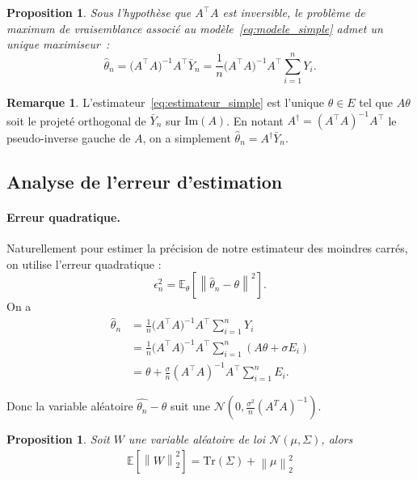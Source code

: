 \documentclass[12pt, a4paper]{article}
\newtheorem{proposition}[theorem]{Proposition}
\theoremstyle{definition}
\newtheorem{remark}[theorem]{Remarque}
\newcommand{\E}{\mathbb{E}}
\newcommand{\norm}[1]{\left\|#1\right\|}
\newcommand{\Tr}{\mathrm{Tr}}
\begin{document}
\begin{proposition}
Sous l'hypothèse que $A^\top A$ est inversible, le problème de maximum de
vraisemblance associé au modèle~\eqref{eq:modele_simple} admet un unique
maximiseur~:
\begin{equation}
    \hat{\theta}_n
    = \bigl(A^\top A\bigr)^{-1}A^\top \bar{Y}_n
    = \frac{1}{n}\bigl(A^\top A\bigr)^{-1}A^\top\sum_{i=1}^{n} Y_i.
    \label{eq:estimateur_simple}
\end{equation}
\end{proposition}

\begin{remark}
L'estimateur~\eqref{eq:estimateur_simple} est l'unique $\theta \in E$ tel que
$A\theta$ soit le projeté orthogonal de $\bar{Y}_n$ sur $\mathrm{Im}(A)$.
En notant $A^\dagger = (A^\top A)^{-1}A^\top$ le pseudo-inverse gauche de $A$,
on a simplement $\hat{\theta}_n = A^\dagger\bar{Y}_n$.
\end{remark}

\subsection{Analyse de l'erreur d'estimation}
\label{subsec:erreur_simple}


\paragraph{Erreur quadratique.}
Naturellement pour estimer la précision de notre estimateur des moindres
carrés, on utilise l'erreur quadratique :
\[
    \epsilon_n^2 = \E_{\theta}\!\left[\norm{\hat{\theta}_n - \theta}^2\right].
\]
On a
\begin{align*}
    \hat{\theta}_n
    &= \frac{1}{n}\bigl(A^\top A\bigr)^{-1}A^\top\sum_{i=1}^{n} Y_i \\
    &= \frac{1}{n}\bigl(A^\top A\bigr)^{-1}A^\top\sum_{i=1}^{n} (A\theta + \sigma E_i) \\
    &= \theta + \frac{\sigma}{n}(A^\top A)^{-1}A^\top \sum_{i=1}^{n} E_i.
\end{align*}

Donc la variable aléatoire $\hat{\theta_n} - \theta$ suit une 
$\mathcal{N}(0, \frac{\sigma^2}{n}(A^TA)^{-1} )$.

\begin{proposition}
Soit $W$ une variable aléatoire de loi $\mathcal{N}(\mu, \Sigma)$, alors
\begin{align*}
    \mathbb{E}[\norm{W}_2 ^2] = \Tr(\Sigma)
    + \norm{\mu}_2 ^2
\end{align*}
\end{proposition}
\end{document}
